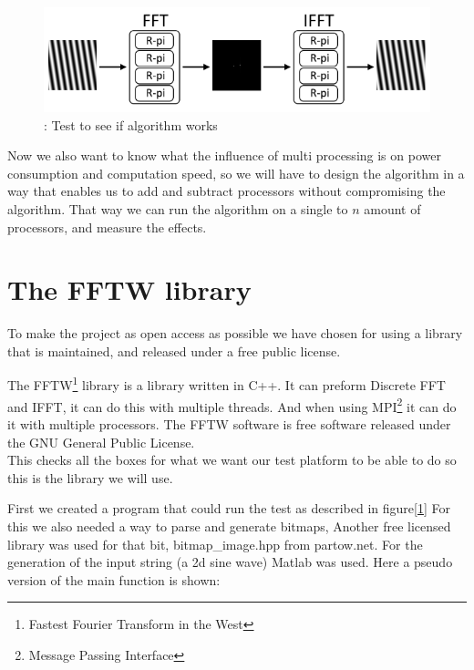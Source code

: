 \documentclass[11pt, A4, oneside]{article}
\begin{document}
\begin{figure}[!ht]
	\centering
	\includegraphics[width=\linewidth]{algorithm_test}
	\caption{: Test to see if algorithm works}
	\label{algorithm test}
\end{figure}

Now we also want to know what the influence of multi processing is on power consumption and computation speed, so we will have to design the algorithm in a way that enables us to add and subtract processors without compromising the algorithm. That way we can run the algorithm on a single to \(n\) amount of processors, and measure the effects. 

\newpage

\section{The FFTW library}

To make the project as open access as possible we have chosen for using a library that is maintained, and released under a free public license.\par The FFTW\footnote{Fastest Fourier Transform in the West} library is a library written in C++. It can preform Discrete FFT and IFFT, it can do this with multiple threads. And when using MPI\footnote{Message Passing Interface} it can do it with multiple processors. The FFTW software is free software released under the GNU General Public License. \\ This checks all the boxes for what we want our test platform to be able to do so this is the library we will use. \par 
First we created a program that could run the test as described in figure[\ref{algorithm test}] For this we also needed a way to parse and generate bitmaps, Another free licensed library was used for that bit,  bitmap\_image.hpp from partow.net. For the generation of the input string (a 2d sine wave) Matlab was used. Here a pseudo version of the main function is shown: 
\end{document}
